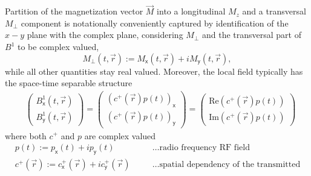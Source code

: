 \documentclass{ws-m3as}
\renewcommand\Re{\mathrm{Re}}
\renewcommand\Im{\mathrm{Im}}
\begin{document}
Partition of the magnetization vector $\vec M$ into a longitudinal $M_z$ and a transversal $M_{\perp}$ component is notationally conveniently captured by identification of the $x-y$ plane with the complex plane, considering $M_\perp$ and the transversal part of
$B^1$ to be complex valued, 
\[
M_{\perp}(t, \vec r) := M_{\mathsf{x}}(t, \vec r) + i M_{\mathsf{y}}(t, \vec r), 
\]
while all other quantities stay real valued. 
Moreover, the local field typically has the space-time separable structure
\[
\begin{aligned}
&\begin{pmatrix} B^1_{\mathsf{x}}(t, \vec r) \\ B^1_{\mathsf{y}}(t, \vec r)\end{pmatrix}
= \begin{pmatrix} (c^+(\vec r) p(t))_{\mathsf{x}}\\(c^+(\vec r) p(t))_{\mathsf{y}}\end{pmatrix}
= \begin{pmatrix} \Re(c^+(\vec r) p(t))\\\Im(c^+(\vec r) p(t))\end{pmatrix}
\end{aligned}
\]
where both $c^+$ and $p$ are complex valued
\[
\begin{aligned}
&p(t) := p_{\mathsf{x}}(t) + i p_{\mathsf{y}}(t) \quad&& \text{\ldots radio frequency RF field}\\
&c^+(\vec r) := c^+_{\mathsf{x}}(\vec r) + i c^+_{\mathsf{y}}(\vec r) \quad&& \text{\ldots spatial
dependency of the transmitted field. 
}
\end{aligned}
\]
\end{document}
